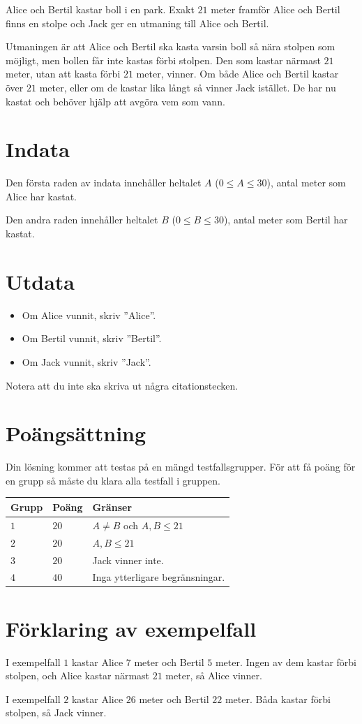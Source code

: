 Alice och Bertil kastar boll i en park. Exakt $21$ meter framför Alice och Bertil finns en stolpe och Jack ger en utmaning till Alice och Bertil.

Utmaningen är att Alice och Bertil ska kasta varsin boll så nära stolpen som möjligt, men bollen får inte kastas förbi stolpen.
Den som kastar närmast $21$ meter, utan att kasta förbi $21$ meter, vinner. Om både Alice och Bertil kastar över $21$ meter, eller om de kastar lika långt så vinner Jack istället.
De har nu kastat och behöver hjälp att avgöra vem som vann.

\section*{Indata}
Den första raden av indata innehåller heltalet $A$ ($0 \leq A \leq 30$),
antal meter som Alice har kastat.

Den andra raden innehåller heltalet $B$ ($0 \leq B \leq 30$),
antal meter som Bertil har kastat.

\section*{Utdata}

\begin{itemize}
  \item Om Alice vunnit, skriv ''Alice''.
  \item Om Bertil vunnit, skriv ''Bertil''.
  \item Om Jack vunnit, skriv ''Jack''.
\end{itemize}
Notera att du inte ska skriva ut några citationstecken.

\section*{Poängsättning}
Din lösning kommer att testas på en mängd testfallsgrupper.
För att få poäng för en grupp så måste du klara alla testfall i gruppen.

\noindent
\begin{tabular}{| l | l | p{12cm} |}
  \hline
  \textbf{Grupp} & \textbf{Poäng} & \textbf{Gränser} \\ \hline
  $1$    & $20$       & $A \neq B$ och $A, B \leq 21$ \\ \hline
  $2$    & $20$       & $A, B \leq 21$ \\ \hline
  $3$    & $20$       & Jack vinner inte. \\ \hline
  $4$    & $40$       & Inga ytterligare begränsningar. \\ \hline
\end{tabular}

\section*{Förklaring av exempelfall}
I exempelfall $1$ kastar Alice $7$ meter och Bertil $5$ meter.
Ingen av dem kastar förbi stolpen, och Alice kastar närmast $21$ meter, så Alice vinner.

I exempelfall $2$ kastar Alice $26$ meter och Bertil $22$ meter.
Båda kastar förbi stolpen, så Jack vinner.
